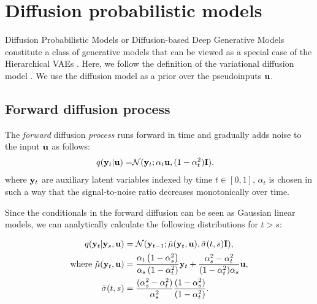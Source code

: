 \newpage
\section{Diffusion probabilistic models}\label{appendix:ddgm_theory}

Diffusion Probabilistic Models  or Diffusion-based Deep Generative Models \citep{ho2020denoising, sohl2015deep} constitute a class of generative models that can be viewed as a special case of the Hierarchical VAEs \citep{huang2021variational, kingma2021variational, tomczak2022deep, tzen2019neural}. Here, we follow the definition of the variational diffusion model \citep{kingma2021variational}. We use the diffusion model as a prior over the pseudoinputs ${\mathbf{u}}$.

\subsection*{Forward diffusion process}

 The \textit{forward} diffusion \textit{process} runs forward in time and gradually adds noise to the input ${\mathbf{u}}$ as follows:
\begin{align}\label{eq:5_dvp_forward_diffusion_latent_from_data}
    q(\rvy_t|\rvu) = &\mathcal{N}(\rvy_t; \alpha_t \rvu, (1 - \alpha_t^2) \mathbf{I}).
\end{align}
where  ${\mathbf{y}}_{t}$ are auxiliary latent variables indexed by time $t \in [0, 1]$, $\alpha_t$ is chosen in such a way that the signal-to-noise ratio decreases monotonically over time.

Since the conditionals in the forward diffusion can be seen as Gaussian linear models, we can analytically calculate the following distributions for $t > s$: 

\begin{align}\label{eq:5_dvp_forward_diffusion_previous_latent}
q(\rvy_{t}|\rvy_{s}, \rvu) &= \mathcal{N}(\rvy_{t-1}; \Tilde{\mu}(\rvy_t, \rvu), \Tilde{\sigma}(t, s) \mathbf{I}) ,\\
\text{where  } \Tilde{\mu}(\rvy_t, \rvu) &= 
\frac{\alpha_{t}\left(1-\alpha_{s}^2\right)}{\alpha_{s}\left(1-\alpha_{t}^2\right)} \rvy_{t}+
    \frac{\alpha_s^2 - \alpha_t^2}{(1-\alpha_{t}^2)\alpha_s} \rvu, \\
\Tilde{\sigma}(t, s) &=  \frac{(\alpha_s^2 - \alpha_t^2)}{\alpha_s^2}\frac{(1 - \alpha_s^2)}{(1 - \alpha_t^2)} .
\end{align}

